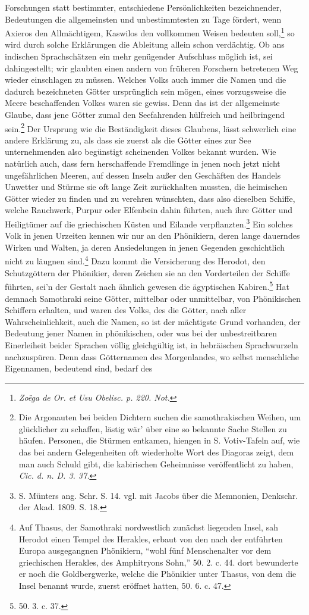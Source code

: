 \documentclass[a4paper, 11pt, oneside]{article}
\begin{document}
Forschungen statt bestimmter, entschiedene Persönlichkeiten bezeichnender, Bedeutungen die allgemeinsten und unbestimmtesten zu Tage fördert, wenn Axieros den Allmächtigem, Kaswilos den vollkommen Weisen bedeuten soll,\footnote{\emph{Zoëga de Or. et Usu Obelisc. p. 220. Not.}} so wird durch solche Erklärungen die Ableitung allein schon verdächtig. Ob ans indischen Sprachschätzen ein mehr genügender Aufschluss möglich ist, sei dahingestellt; wir glaubten einen andern von früheren Forschern betretenen Weg wieder einschlagen zu müssen. Welches Volks auch immer die Namen und die dadurch bezeichneten Götter ursprünglich sein mögen, eines vorzugsweise die Meere beschaffenden Volkes waren sie gewiss. Denn das ist der allgemeinste Glaube, dass jene Götter zumal den Seefahrenden hülfreich und heilbringend sein.\footnote{Die Argonauten bei beiden Dichtern suchen die samothrakischen Weihen, um glücklicher zu schaffen, lästig wär' über eine so bekannte Sache Stellen zu häufen. Personen, die Stürmen entkamen, hiengen in S. Votiv-Tafeln auf, wie das bei andern Gelegenheiten oft wiederholte Wort des Diagoras zeigt, dem man auch Schuld gibt, die kabirischen Geheimnisse veröffentlicht zu haben, \emph{Cic. d. n. D. 3. 37.}} Der Ursprung wie die Beständigkeit dieses Glaubens, lässt schwerlich eine andere Erklärung zu, als dass sie zuerst als die Götter eines zur See unternehmenden also begünstigt scheinenden Volkes bekannt wurden. Wie natürlich auch, dass fern herschaffende Fremdlinge in jenen noch jetzt nicht ungefährlichen Meeren, auf dessen Inseln außer den Geschäften des Handels Unwetter und Stürme sie oft lange Zeit zurückhalten mussten, die heimischen Götter wieder zu finden und zu verehren wünschten, dass also dieselben Schiffe, welche Rauchwerk, Purpur oder Elfenbein dahin führten, auch ihre Götter und Heiligtümer auf die griechischen Küsten und Eilande verpflanzten.\footnote{S. Münters ang. Schr. S. 14. vgl. mit Jacobs über die Memnonien, Denkschr. der Akad. 1809. S. 18.} Ein solches Volk in jenen Urzeiten kennen wir nur an den Phönikiern, deren lange dauerndes Wirken und Walten, ja deren Ansiedelungen in jenen Gegenden geschichtlich nicht zu läugnen sind.\footnote{Auf Thasus, der Samothraki nordwestlich zunächst liegenden Insel, sah Herodot einen Tempel des Herakles, erbaut von den nach der entführten Europa ausgegangnen Phönikiern, "`wohl fünf Menschenalter vor dem griechischen Herakles, des Amphitryons Sohn,"' 50. 2. c. 44. dort bewunderte er noch die Goldbergwerke, welche die Phönikier unter Thasus, von dem die Insel benannt wurde, zuerst eröffnet hatten, 50. 6. c. 47.} Dazu kommt die Versicherung des Herodot, den Schutzgöttern der Phönikier, deren Zeichen sie an den Vorderteilen der Schiffe führten, sei'n der Gestalt nach ähnlich gewesen die ägyptischen Kabiren.\footnote{50. 3. c. 37.} Hat demnach Samothraki seine Götter, mittelbar oder unmittelbar, von Phönikischen Schiffern erhalten, und waren des Volks, des die Götter, nach aller Wahrscheinlichkeit, auch die Namen, so ist der mächtigste Grund vorhanden, der Bedeutung jener Namen in phönikischen, oder was bei der unbestreitbaren Einerleiheit beider Sprachen völlig gleichgültig ist, in hebräischen Sprachwurzeln nachzuspüren. Denn dass Götternamen des Morgenlandes, wo selbst menschliche Eigennamen, bedeutend sind, bedarf des 
\end{document}
